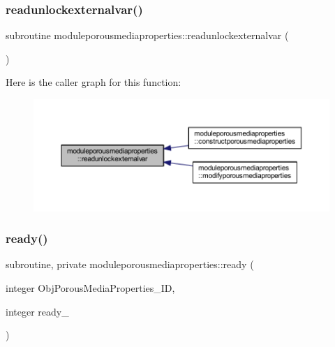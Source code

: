 \subsubsection{\texorpdfstring{readunlockexternalvar()}{readunlockexternalvar()}}
{\footnotesize\ttfamily subroutine moduleporousmediaproperties\+::readunlockexternalvar (\begin{DoxyParamCaption}{ }\end{DoxyParamCaption})\hspace{0.3cm}{\ttfamily [private]}}

Here is the caller graph for this function\+:\nopagebreak
\begin{figure}[H]
\begin{center}
\leavevmode
\includegraphics[width=350pt]{namespacemoduleporousmediaproperties_aa21cfad85460a30a39a9fb8f3421f874_icgraph}
\end{center}
\end{figure}
\mbox{\label{namespacemoduleporousmediaproperties_a1a2026bd74e611727f9dca5173548d05}} 
\subsubsection{\texorpdfstring{ready()}{ready()}}
{\footnotesize\ttfamily subroutine, private moduleporousmediaproperties\+::ready (\begin{DoxyParamCaption}\item[{integer}]{Obj\+Porous\+Media\+Properties\+\_\+\+ID,  }\item[{integer}]{ready\+\_\+ }\end{DoxyParamCaption})\hspace{0.3cm}{\ttfamily [private]}}

